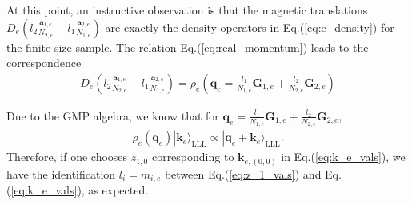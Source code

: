 At this point, an instructive observation is that the magnetic translations $D_e(l_2\frac{\mathbf a_{1,e}}{N_{2,e}}-l_1\frac{\mathbf a_{2,e}}{N_{1,e}})$ are exactly the density operators in Eq.(\ref{eq:e_density}) for the finite-size sample. The relation Eq.(\ref{eq:real_momentum}) leads to the correspondence
\begin{align}
    D_e\left(l_2\frac{\mathbf a_{1,e}}{N_{2,e}}-l_1\frac{\mathbf a_{2,e}}{N_{1,e}}\right)=\rho_e\left(\mathbf q_e= \frac{l_1}{N_{1,e}} \mathbf G_{1,e} + \frac{l_2}{N_{2,e}} \mathbf G_{2,e}\right)\label{eq:mag_transl_vs_density}
\end{align}

Due to the GMP algebra, we know that for $\mathbf q_e= \frac{l_1}{N_{1,e}} \mathbf G_{1,e} + \frac{l_2}{N_{2,e}} \mathbf G_{2,e}$,
\begin{align}
    \rho_e(\mathbf q_e)|\mathbf k_e\rangle_{\text{LLL}} \propto |\mathbf q_e+\mathbf k_e\rangle_{\text{LLL}}.
\end{align}
Therefore, if one chooses $z_{1,0}$ corresponding to $\mathbf k_{e,(0,0)}$ in Eq.(\ref{eq:k_e_vals}), we have the identification $l_i=m_{i,e}$ between Eq.(\ref{eq:z_1_vals}) and Eq.(\ref{eq:k_e_vals}), as expected.

